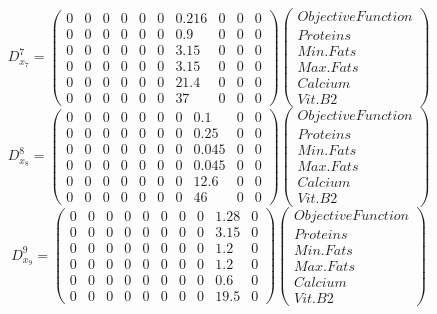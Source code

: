 \documentclass[a4paper,12pt]{article}
\begin{document}
\[
D^7_{x_7} = \begin{pmatrix}
0 & 0 & 0 & 0 & 0 & 0 & 0.216 & 0 & 0 & 0 \\
0 & 0 & 0 & 0 & 0 & 0 & 0.9 & 0 & 0 & 0 \\
0 & 0 & 0 & 0 & 0 & 0 & 3.15 & 0 & 0 & 0 \\ 
0 & 0 & 0 & 0 & 0 & 0 & 3.15 & 0 & 0 & 0 \\ 
0 & 0 & 0 & 0 & 0 & 0 & 21.4 & 0 & 0 & 0 \\ 
0 & 0 & 0 & 0 & 0 & 0 & 37 & 0 & 0 & 0 
\end{pmatrix}
\begin{pmatrix}
    Objective Function \\
    Proteins \\
    Min. Fats \\
    Max. Fats \\
    Calcium \\
    Vit. B2
\end{pmatrix}
\]
\[
D^8_{x_8} = \begin{pmatrix}
0 & 0 & 0 & 0 & 0 & 0 & 0 & 0.1 & 0 & 0 \\
0 & 0 & 0 & 0 & 0 & 0 & 0 & 0.25 & 0 & 0 \\
0 & 0 & 0 & 0 & 0 & 0 & 0 & 0.045 & 0 & 0 \\
0 & 0 & 0 & 0 & 0 & 0 & 0 & 0.045 & 0 & 0 \\
0 & 0 & 0 & 0 & 0 & 0 & 0 & 12.6 & 0 & 0 \\ 
0 & 0 & 0 & 0 & 0 & 0 & 0 & 46 & 0 & 0 
\end{pmatrix}
\begin{pmatrix}
    Objective Function \\
    Proteins \\
    Min. Fats \\
    Max. Fats \\
    Calcium \\
    Vit. B2
\end{pmatrix}
\]
\[
D^9_{x_9} = \begin{pmatrix}
0 & 0 & 0 & 0 & 0 & 0 & 0 & 0 & 1.28 & 0 \\
0 & 0 & 0 & 0 & 0 & 0 & 0 & 0 & 3.15 & 0 \\
0 & 0 & 0 & 0 & 0 & 0 & 0 & 0 & 1.2 & 0 \\ 
0 & 0 & 0 & 0 & 0 & 0 & 0 & 0 & 1.2 & 0 \\ 
0 & 0 & 0 & 0 & 0 & 0 & 0 & 0 & 0.6 & 0 \\
0 & 0 & 0 & 0 & 0 & 0 & 0 & 0 & 19.5 & 0 
\end{pmatrix}
\begin{pmatrix}
    Objective Function \\
    Proteins \\
    Min. Fats \\
    Max. Fats \\
    Calcium \\
    Vit. B2
\end{pmatrix}
\]
\end{document}
